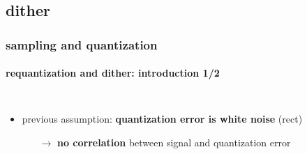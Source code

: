         \subsection{dither}
	\begin{frame}\frametitle{sampling and quantization}\framesubtitle{requantization and dither: introduction 1/2}
        \begin{columns}
		\begin{itemize}
			\item	previous assumption: \textbf{quantization error is white noise} (rect)
				\pause
				\begin{itemize}
					\item[$\rightarrow$]	\textbf{no correlation} between signal and quantization error
				\end{itemize}
                \smallskip
		\end{itemize}
    \end{columns}
	\end{frame}	
